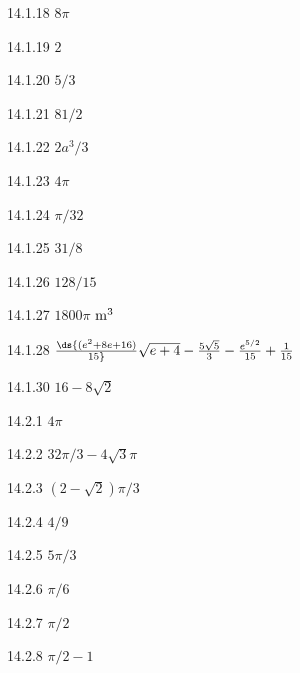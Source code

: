 \begin{Answer}{14.1.18}
$8\pi$
\end{Answer}
\begin{Answer}{14.1.19}
$2$
\end{Answer}
\begin{Answer}{14.1.20}
$5/3$
\end{Answer}
\begin{Answer}{14.1.21}
$81/2$
\end{Answer}
\begin{Answer}{14.1.22}
$2a^3/3$
\end{Answer}
\begin{Answer}{14.1.23}
$4\pi$
\end{Answer}
\begin{Answer}{14.1.24}
$\pi/32$
\end{Answer}
\begin{Answer}{14.1.25}
$31/8$
\end{Answer}
\begin{Answer}{14.1.26}
$128/15$
\end{Answer}
\begin{Answer}{14.1.27}
$1800\pi$ ${\rm m}^3$
\end{Answer}
\begin{Answer}{14.1.28}
$\ds{(e^2+8e+16)\over15}\sqrt{e+4}-{5\sqrt5\over3}-{e^{5/2}\over15}
+{1\over15}$
\end{Answer}
\begin{Answer}{14.1.30}
$16-8\sqrt{2}$
\end{Answer}
\begin{Answer}{14.2.1}
$4\pi$
\end{Answer}
\begin{Answer}{14.2.2}
$32\pi/3-4\sqrt3\pi$
\end{Answer}
\begin{Answer}{14.2.3}
$(2-\sqrt2)\pi/3$
\end{Answer}
\begin{Answer}{14.2.4}
$4/9$
\end{Answer}
\begin{Answer}{14.2.5}
$5\pi/3$
\end{Answer}
\begin{Answer}{14.2.6}
$\pi/6$
\end{Answer}
\begin{Answer}{14.2.7}
$\pi/2$
\end{Answer}
\begin{Answer}{14.2.8}
$\pi/2-1$
\end{Answer}
